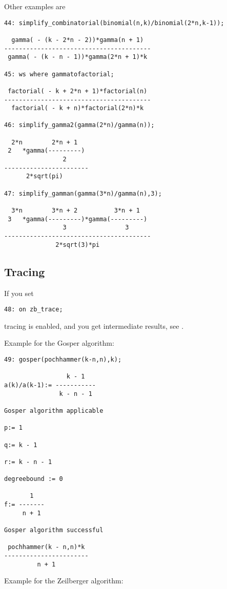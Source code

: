 Other examples are

{\small
\begin{verbatim}
44: simplify_combinatorial(binomial(n,k)/binomial(2*n,k-1));

  gamma( - (k - 2*n - 2))*gamma(n + 1)
----------------------------------------
 gamma( - (k - n - 1))*gamma(2*n + 1)*k

45: ws where gammatofactorial;

 factorial( - k + 2*n + 1)*factorial(n)
----------------------------------------
  factorial( - k + n)*factorial(2*n)*k

46: simplify_gamma2(gamma(2*n)/gamma(n));

  2*n        2*n + 1
 2   *gamma(---------)
                2
-----------------------
      2*sqrt(pi)

47: simplify_gamman(gamma(3*n)/gamma(n),3);

  3*n        3*n + 2          3*n + 1
 3   *gamma(---------)*gamma(---------)
                3                3
----------------------------------------
              2*sqrt(3)*pi
\end{verbatim}
}\noindent

\subsection{Tracing}
If you set 

{\small
\begin{verbatim}
48: on zb_trace;
\end{verbatim}
}\noindent
tracing is enabled, and you get intermediate results, see \cite{Koepf}. 

Example for the Gosper algorithm:

{\small
\begin{verbatim}
49: gosper(pochhammer(k-n,n),k);

                 k - 1
a(k)/a(k-1):= -----------
               k - n - 1

Gosper algorithm applicable

p:= 1

q:= k - 1

r:= k - n - 1

degreebound := 0

       1
f:= -------
     n + 1

Gosper algorithm successful

 pochhammer(k - n,n)*k
-----------------------
         n + 1
\end{verbatim}
}\noindent
\vspace*{3mm}\noindent
Example for the Zeilberger algorithm:


